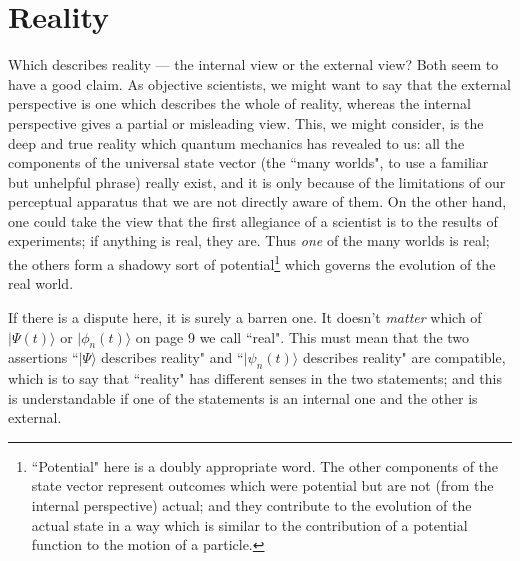 \documentclass[12pt,a4paper,reqno]{article}
\renewcommand{\(}{\left(}
\renewcommand{\)}{\right)}
\newcommand{\<}{\langle}
\renewcommand{\>}{\rangle}
\theoremstyle{plain} %
\theoremstyle{definition}
\theoremstyle{remark}
\begin{document}
\medskip
\section{Reality}

Which describes reality --- the internal view or the external view? Both
seem to have a good claim. As objective scientists, we might want to say
that the  external perspective is one which describes the whole of
reality, whereas the internal perspective gives a partial or misleading
view. This, we might consider, is the deep and true reality which
quantum mechanics has revealed to us: all the components of the
universal state vector (the ``many worlds", to use a familiar but
unhelpful phrase) really exist, and it is only because of the
limitations of our perceptual apparatus that we are not directly aware
of them. On the other hand, one could take the view that the first
allegiance of a scientist is to the results of experiments; if anything
is real, they are. Thus \emph{one} of the many worlds is real; the
others form a shadowy sort of potential\footnote{``Potential" here is a doubly
appropriate word. The other components of the state vector represent
outcomes which were potential but are not (from the internal
perspective) actual; and they contribute to the evolution of the actual
state in a way which is similar to the contribution of a potential
function to the motion of a particle.} which governs
the evolution of the real world.  

If there is a dispute here, it is surely a barren one. It doesn't
\emph{matter} which of $|\Psi(t)\>$ or $|\phi_n(t)\>$ on page 9 we call
``real". This must mean that the two assertions ``$|\Psi\>$  describes
reality" and ``$|\psi_n(t)\>$ describes reality" are compatible, which
is to say that ``reality" has different senses in the two statements;
and this is understandable if one of the statements is an internal one
and the other is external.
\end{document}

